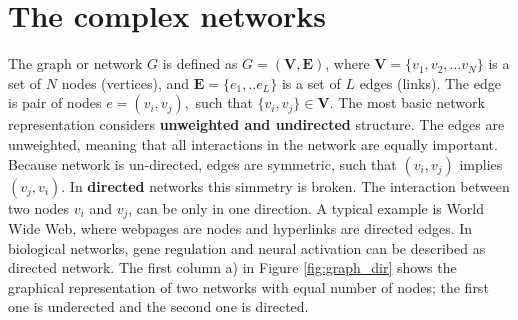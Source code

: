 

\section{The complex networks}

The graph or network $G$ is defined as $G=(\boldsymbol{V}, \boldsymbol{E})$, where $\boldsymbol{V} = \{ v_1, v_2, ... v_N\}$ is a set of $N$ nodes (vertices), and  $\boldsymbol{E} = \{e_1, .. e_L\}$ is a set of $L$ edges (links). The edge is pair of nodes $e = (v_i, v_j), $ such that $\{v_i,v_j\}\in \boldsymbol{V}$. The most basic network representation considers \textbf{unweighted and undirected} structure. The edges are unweighted, meaning that all interactions in the network are equally important.  Because network is un-directed, edges are symmetric, such that $(v_i, v_j)$ implies $(v_j, v_i)$. In \textbf{directed} networks this simmetry is broken. The interaction between two nodes $v_i$ and $v_j$, can be only in one direction. A typical example is World Wide Web, where webpages are nodes and hyperlinks are directed edges. In biological networks, gene regulation and neural activation can be described as directed network. The first column a) in Figure \ref{fig:graph_dir} shows the graphical representation of two networks with equal number of nodes; the first one is underected and the second one is directed. 

